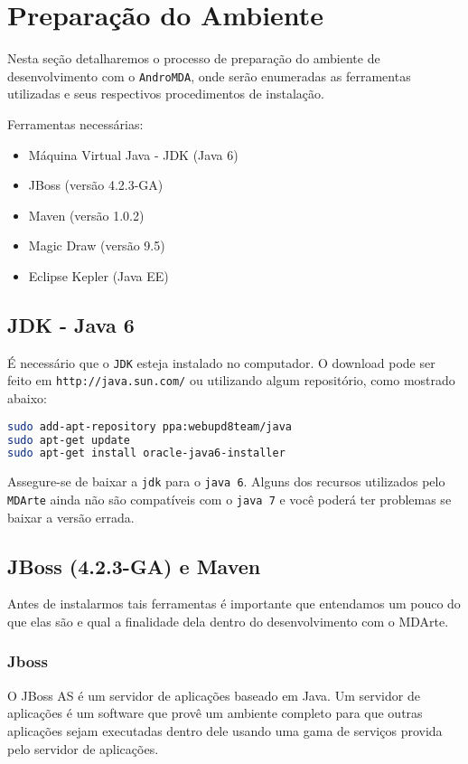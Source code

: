 \chapter{Preparação do Ambiente}

Nesta seção detalharemos o processo de preparação do ambiente de desenvolvimento
com o \texttt{AndroMDA}, onde serão enumeradas as ferramentas utilizadas e seus
respectivos procedimentos de instalação.

Ferramentas necessárias:
\begin{itemize}
  \item Máquina Virtual Java - JDK (Java 6)
  \item JBoss (versão 4.2.3-GA)
  \item Maven (versão 1.0.2) 
  \item Magic Draw (versão 9.5)
  \item Eclipse Kepler (Java EE)
\end{itemize}

\section{JDK - Java 6}

É necessário que o \texttt{JDK} esteja instalado no computador. O
download pode ser feito em \texttt{http://java.sun.com/} ou utilizando
algum repositório, como mostrado abaixo:

\begin{lstlisting}[language=bash]
sudo add-apt-repository ppa:webupd8team/java
sudo apt-get update
sudo apt-get install oracle-java6-installer
\end{lstlisting}

Assegure-se de baixar a \texttt{jdk} para o \texttt{java 6}. Alguns dos recursos
utilizados pelo \texttt{MDArte} ainda não são compatíveis com o \texttt{java 7}
e você poderá ter problemas se baixar a versão errada.

\section{JBoss (4.2.3-GA) e Maven}

Antes de instalarmos tais ferramentas é importante que entendamos um pouco do
que elas são e qual a finalidade dela dentro do desenvolvimento com o MDArte.

\subsection{Jboss}
O JBoss AS é um servidor de aplicações baseado em Java. Um servidor de
aplicações é um software que provê um ambiente completo para que outras
aplicações sejam executadas dentro dele usando uma gama de serviços provida pelo
servidor de aplicações.

